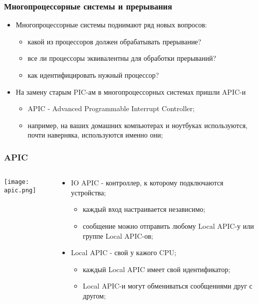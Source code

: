\begin{frame}
\frametitle{Многопроцессорные системы и прерывания}
\begin{itemize}
  \item Многопроцессорные системы поднимают ряд новых вопросов:
  \begin{itemize}
    \item какой из процессоров должен обрабатывать прерывание?
    \item все ли процессоры эквивалентны для обработки прерываний?
    \item как идентифицировать нужный процессор?
  \end{itemize}
  \item На замену старым PIC-ам в многопроцессорных системах пришли APIC-и
  \begin{itemize}
    \item APIC - Advanced Programmable Interrupt Controller;
    \item например, на ваших домашних компьютерах и ноутбуках используются,
    почти наверняка, используются именно они;
  \end{itemize}
\end{itemize}
\end{frame}

\begin{frame}
\frametitle{APIC}
\begin{columns}
  \begin{column}{0.35\textwidth}
  \begin{center}
    \texttt{[image: apic.png]}
  \end{center}
  \end{column}
  \begin{column}{0.65\textwidth}
  \begin{itemize}
    \item IO APIC - контроллер, к которому подключаются устройства;
    \begin{itemize}
      \item каждый вход настраивается независимо;
      \item сообщение можно отправить любому Local APIC-у или группе Local
      APIC-ов;
    \end{itemize}
    \item Local APIC - свой у кажого CPU;
    \begin{itemize}
      \item каждый Local APIC имеет свой идентификатор;
      \item Local APIC-и могут обмениваться сообщениями друг с другом;
    \end{itemize}
  \end{itemize}
  \end{column}
\end{columns}
\end{frame}

